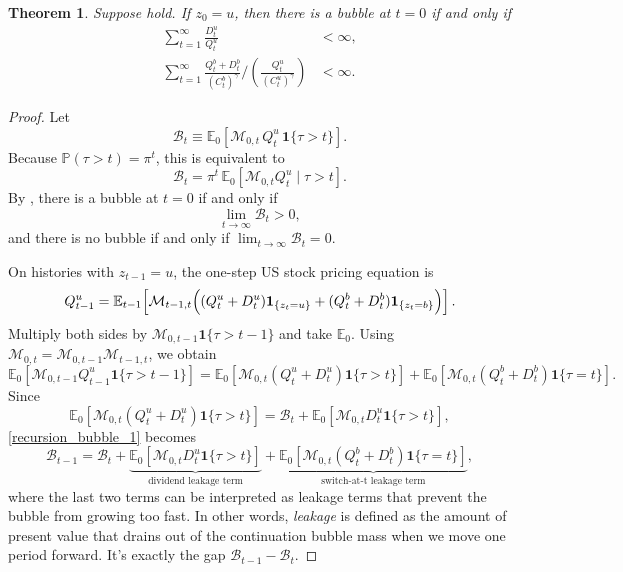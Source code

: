\documentclass[12pt]{article}
\theoremstyle{plain}
\newtheorem{thm}{Theorem}
\begin{document}
\begin{thm}\label{thm_1}
Suppose  hold. If $z_0=u$, then there is a bubble at $t=0$ if and only if
\begin{subequations}\label{thm_cond1}
\begin{align}
\sum_{t=1}^\infty \frac{D_t^u}{Q_t^u}&<\infty, \label{thm_cond_1a}\\
\sum_{t=1}^\infty
{\frac{Q_t^b+D_t^b}{(C_t^b)^\gamma}}\big/\left({\frac{Q_t^u}{(C_t^u)^\gamma}}\right)&<\infty. \label{thm_cond_1b}
\end{align}
\end{subequations}
\end{thm}
\begin{proof}
Let
\[
\mathcal B_t \equiv \mathbb E_0\!\left[\mathcal M_{0,t}\,Q_t^u\,\mathbf 1\{\tau>t\}\right].
\]
Because $\mathbb P(\tau>t)=\pi^t$, this is equivalent to
\[
\mathcal B_t
=
\pi^t\,\mathbb E_0\!\left[\mathcal M_{0,t}Q_t^u\mid \tau>t\right].
\]
By , there is a bubble at $t=0$ if and only if
\[
\lim_{t\to\infty}\mathcal B_t>0,
\]
and there is no bubble if and only if $\lim_{t\to\infty}\mathcal B_t=0$.

On histories with $z_{t-1}=u$, the one-step US stock pricing equation is
\[
Q_{t-1}^u
=
\mathbb E_{t-1}\!\left[
\mathcal M_{t-1,t}
\Bigl(
(Q_t^u+D_t^u)\mathbf 1_{\{z_t=u\}}
+
(Q_t^b+D_t^b)\mathbf 1_{\{z_t=b\}}
\Bigr)
\right].
\]
Multiply both sides by $\mathcal M_{0,t-1}\mathbf 1\{\tau>t-1\}$ and take $\mathbb E_0$. Using
$\mathcal M_{0,t}=\mathcal M_{0,t-1}\mathcal M_{t-1,t}$, we obtain
\begin{equation}\label{recursion_bubble_1}
\mathbb E_0\!\left[\mathcal M_{0,t-1}Q_{t-1}^u\mathbf 1\{\tau>t-1\}\right]
=
\mathbb E_0\!\left[\mathcal M_{0,t}(Q_t^u+D_t^u)\mathbf 1\{\tau>t\}\right]
+
\mathbb E_0\!\left[\mathcal M_{0,t}(Q_t^b+D_t^b)\mathbf 1\{\tau=t\}\right].
\end{equation}
Since
\[
\mathbb E_0\!\left[\mathcal M_{0,t}(Q_t^u+D_t^u)\mathbf 1\{\tau>t\}\right]
=
\mathcal B_t+\mathbb E_0\!\left[\mathcal M_{0,t}D_t^u\mathbf 1\{\tau>t\}\right],
\]
\eqref{recursion_bubble_1} becomes
\begin{equation}\label{bubble_recursion_2}
\mathcal B_{t-1}
=
\mathcal B_t
+\underbrace{\mathbb E_0\!\left[\mathcal M_{0,t}D_t^u\mathbf 1\{\tau>t\}\right]}_{\text{dividend leakage term}}
+\underbrace{\mathbb E_0\!\left[\mathcal M_{0,t}(Q_t^b+D_t^b)\mathbf 1\{\tau=t\}\right]}_{
	\text{switch-at-t leakage term}},
\end{equation}
where the last two terms can be interpreted as leakage terms that prevent the bubble from growing too fast. 
In other words, \textit{leakage} is defined as the amount of present value that drains out of the 
continuation bubble mass when we move one period forward. It’s exactly the gap $\mathcal  B_{t-1}-\mathcal B_t$.


\end{proof}
\end{document}
